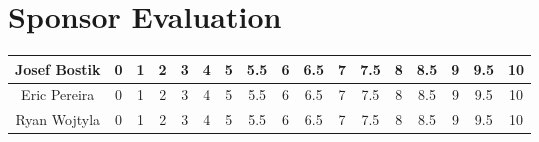 \documentclass[12pt]{article}
\begin{document}
\section{Sponsor Evaluation}
\begin{tabular}{|c|c|c|c|c|c|c|c|c|c|c|c|c|c|c|c|c|}
	\hline
	Josef Bostik & 0 & 1 & 2 & 3 & 4 & 5 & 5.5 & 6 & 6.5 & 7 & 7.5 & 8 & 8.5 & 9 & 9.5 & 10\\
	\hline
	Eric Pereira & 0 & 1 & 2 & 3 & 4 & 5 & 5.5 & 6 & 6.5 & 7 & 7.5 & 8 & 8.5 & 9 & 9.5 & 10\\
	\hline
	Ryan Wojtyla & 0 & 1 & 2 & 3 & 4 & 5 & 5.5 & 6 & 6.5 & 7 & 7.5 & 8 & 8.5 & 9 & 9.5 & 10\\
	\hline
\end{tabular}
\end{document}
